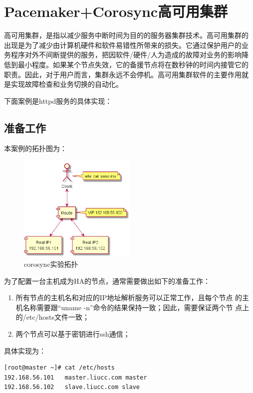 \chapter{Pacemaker+Corosync高可用集群}

高可用集群，是指以减少服务中断时间为目的的服务器集群技术。高可用集群的
出现是为了减少由计算机硬件和软件易错性所带来的损失。它通过保护用户的业
务程序对外不间断提供的服务，把因软件/硬件/人为造成的故障对业务的影响降
低到最小程度。如果某个节点失效，它的备援节点将在数秒钟的时间内接管它的
职责。因此，对于用户而言，集群永远不会停机。高可用集群软件的主要作用就
是实现故障检查和业务切换的自动化。

下面案例是httpd服务的具体实现：

\section{准备工作}

本案例的拓扑图为：

\begin{figure}[!htbp]
  \centering
  \includegraphics[width=0.5\textwidth]{img/web_topo.png}
  \caption{corosync实验拓扑}
\end{figure}

为了配置一台主机成为HA的节点，通常需要做出如下的准备工作：
\begin{enumerate}[itemsep=0pt,parsep=0pt]
  \item 所有节点的主机名和对应的IP地址解析服务可以正常工作，且每个节点
    的主机名称需要跟“uname -n”命令的结果保持一致；因此，需要保证两个节
    点上的/etc/hosts文件一致；
  \item 两个节点可以基于密钥进行ssh通信；
\end{enumerate}

具体实现为：

\begin{verbatim}
[root@master ~]# cat /etc/hosts
192.168.56.101   master.liucc.com master
192.168.56.102	 slave.liucc.com slave
\end{verbatim}

